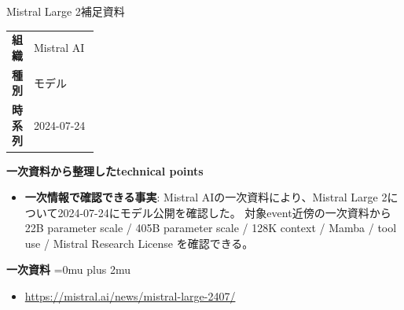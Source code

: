 \begin{technicalnote}{Mistral Large 2}{補足資料}
\begingroup
\begin{tabularx}{\linewidth}{@{}>{\bfseries}p{0.22\linewidth}X@{}}
組織 & Mistral AI \\
種別 & モデル \\
時系列 & 2024-07-24 \\
\end{tabularx}
\smallskip
{\bfseries 一次資料から整理したtechnical points}
\begin{itemize}[leftmargin=1.5em,itemsep=0.35em]
\item \textbf{一次情報で確認できる事実}: Mistral AIの一次資料により、Mistral Large 2について2024-07-24にモデル公開を確認した。 対象event近傍の一次資料から 22B parameter scale / 405B parameter scale / 128K context / Mamba / tool use / Mistral Research License を確認できる。
\end{itemize}
\begin{minipage}{\linewidth}
\begin{samepage}
{\bfseries 一次資料}
\begingroup\sloppy
\Urlmuskip=0mu plus 2mu\relax
\begin{itemize}[leftmargin=1.5em,itemsep=0.25em]
\item {\scriptsize\url{https://mistral.ai/news/mistral-large-2407/}}
\end{itemize}
\endgroup
\end{samepage}
\end{minipage}
\endgroup
\end{technicalnote}
\medskip

